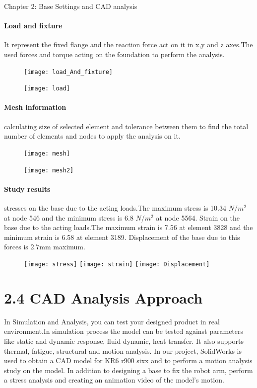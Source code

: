 \documentclass{book}
\begin{document}
\begin{chapter}{Chapter 2: Base Settings and CAD analysis}
\paragraph{Load and fixture}
It represent the fixed flange and the reaction force act on it in x,y and z axes.The used forces and torque acting on the foundation to perform the analysis.
\begin{figure}[H]
	
	\centering
	\texttt{[image: load\_And\_fixture]}
\end{figure}

\begin{figure}[H]
	\centering
	\texttt{[image: load]}
\end{figure}

\paragraph{Mesh information}
calculating size of selected element and tolerance between them to find the total number of elements and nodes to apply the analysis on it.

\begin{figure}[H]
	\centering
	\texttt{[image: mesh]}
\end{figure}

\begin{figure}[H]
\centering
	\texttt{[image: mesh2]}
\end{figure}

\paragraph{Study results}
stresses on the base due to the acting loads.The maximum stress is 10.34 $N$/$m^{2}$ at node 546 and the minimum stress is 6.8 $N$/$m^{2}$ at node 5564. Strain on the base due to the acting loads.The maximum strain is 7.56 at element 3828 and the minimum strain is 6.58 at element 3189. Displacement of the base due to this forces is 2.7mm maximum.

\begin{figure}[H]
	\centering
	\texttt{[image: stress]}
	\texttt{[image: strain]}
	\texttt{[image: Displacement]}
\end{figure}

\newpage
\section{2.4 CAD Analysis Approach}

In Simulation and Analysis, you can test your designed product in real environment.In simulation process the model can be tested against parameters like static and dynamic response, fluid dynamic, heat transfer. It also supports thermal, fatigue, structural and motion analysis. 
\newline In our project, SolidWorks is used to obtain a CAD model for KR6 r900 sixx and to perform a motion analysis study on the model. In addition to designing a base to fix the robot arm, perform a stress analysis and creating an animation video of the model’s motion.


\end{chapter}
\end{document}
